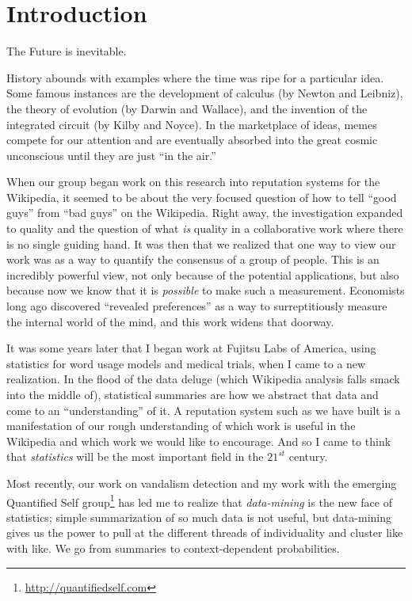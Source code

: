 \section{Introduction}

The Future is inevitable.

History abounds with examples where the time was ripe for a particular idea.
Some famous instances are the development of calculus (by Newton and Leibniz),
the theory of evolution (by Darwin and Wallace), and the invention of
the integrated circuit (by Kilby and Noyce).
In the marketplace of ideas, memes compete for our attention and
are eventually absorbed into the great cosmic unconscious until
they are just ``in the air.''

When our group began work on this research into reputation systems for
the Wikipedia, it seemed to be about the very focused
question of how to tell ``good guys'' from ``bad guys'' on the Wikipedia.
Right away, the investigation expanded to quality and the question of what
\textit{is} quality in a collaborative work where there is no single
guiding hand.
It was then that we realized that one way to view our work was as a
way to quantify the consensus of a group of people.
This is an incredibly powerful view, not only because of the potential
applications, but also because now we know that it is \textit{possible}
to make such a measurement.
Economists long ago discovered ``revealed preferences''
as a way to surreptitiously measure the internal world of the mind,
and this work widens that doorway.

It was some years later that I began work at Fujitsu Labs of America,
using statistics for word usage models and medical trials,
when I came to a new realization.
In the flood of the data deluge (which Wikipedia analysis falls smack
into the middle of), statistical summaries are how we abstract that data
and come to an ``understanding'' of it.
A reputation system such as we have built is a manifestation of our
rough understanding of which work is useful in the Wikipedia and
which work we would like to encourage.
And so I came to think that \textit{statistics} will be the
most important field in the $21^{st}$ century.

Most recently, our work on vandalism detection and my work with the
emerging Quantified Self group\footnote{\url{http://quantifiedself.com}}
has led me to realize that
\textit{data-mining} is the new face of statistics; simple summarization
of so much data is not useful, but data-mining gives us the power to
pull at the different threads of individuality and cluster like with like.
We go from summaries to context-dependent probabilities.


